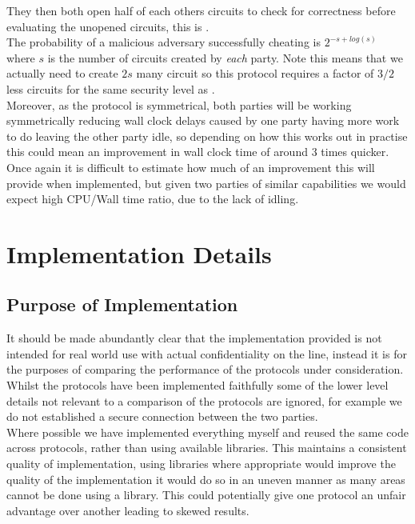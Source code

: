\documentclass[ %
                    author={Nicholas Tutte},
                supervisor={Prof. Nigel Smart},
                    degree={MEng},
                     title={Secure Two Party Computation},
                  subtitle={A practical comparison of recent protocols},
                      type={Research - GG1K},
                      year={2015} ]{dissertation}
\begin{document}
				They then both open half of each others circuits to check for correctness before evaluating the unopened circuits, this is .\\

				The probability of a malicious adversary successfully cheating is $2^{-s + log(s)}$ where $s$ is the number of circuits created by \emph{each} party. Note this means that we actually need to create $2s$ many circuit so this protocol requires a factor of $3/2$ less circuits for the same security level as \cite{LindellAndPinkas2011}.\\
				
				Moreover, as the protocol is symmetrical, both parties will be working symmetrically reducing wall clock delays caused by one party having more work to do leaving the other party idle, so depending on how this works out in practise this could mean an improvement in wall clock time of around $3$ times quicker.\\

				Once again it is difficult to estimate how much of an improvement this will provide when implemented, but given two parties of similar capabilities we would expect high CPU/Wall time ratio, due to the lack of idling.

	\chapter{Implementation Details} \label{sec:ImplementationDetails}
		\section*{Purpose of Implementation}
			It should be made abundantly clear that the implementation provided is not intended for real world use with actual confidentiality on the line, instead it is for the purposes of comparing the performance of the protocols under consideration.\\

			Whilst the protocols have been implemented faithfully some of the lower level details not relevant to a comparison of the protocols are ignored, for example we do not established a secure connection between the two parties.\\

			Where possible we have implemented everything myself and reused the same code across protocols, rather than using available libraries. This maintains a consistent quality of implementation, using libraries where appropriate would improve the quality of the implementation it would do so in an uneven manner as many areas cannot be done using a library. This could potentially give one protocol an unfair advantage over another leading to skewed results.
\end{document}
